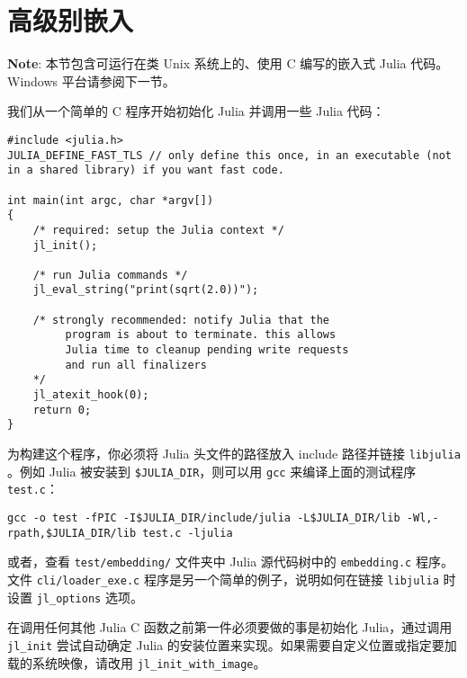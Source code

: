 \hypertarget{10185907435024062430}{}


\section{高级别嵌入}



\textbf{Note}: 本节包含可运行在类 Unix 系统上的、使用 C 编写的嵌入式 Julia 代码。Windows 平台请参阅下一节。



我们从一个简单的 C 程序开始初始化 Julia 并调用一些 Julia 代码：




\begin{lstlisting}
#include <julia.h>
JULIA_DEFINE_FAST_TLS // only define this once, in an executable (not in a shared library) if you want fast code.

int main(int argc, char *argv[])
{
    /* required: setup the Julia context */
    jl_init();

    /* run Julia commands */
    jl_eval_string("print(sqrt(2.0))");

    /* strongly recommended: notify Julia that the
         program is about to terminate. this allows
         Julia time to cleanup pending write requests
         and run all finalizers
    */
    jl_atexit_hook(0);
    return 0;
}
\end{lstlisting}



为构建这个程序，你必须将 Julia 头文件的路径放入 include 路径并链接 \texttt{libjulia} 。例如 Julia 被安装到 \texttt{\$JULIA\_DIR}，则可以用 \texttt{gcc} 来编译上面的测试程序 \texttt{test.c}：




\begin{lstlisting}
gcc -o test -fPIC -I$JULIA_DIR/include/julia -L$JULIA_DIR/lib -Wl,-rpath,$JULIA_DIR/lib test.c -ljulia
\end{lstlisting}



或者，查看 \texttt{test/embedding/} 文件夹中 Julia 源代码树中的 \texttt{embedding.c} 程序。 文件 \texttt{cli/loader\_exe.c} 程序是另一个简单的例子，说明如何在链接 \texttt{libjulia} 时设置 \texttt{jl\_options} 选项。



在调用任何其他 Julia C 函数之前第一件必须要做的事是初始化 Julia，通过调用 \texttt{jl\_init} 尝试自动确定 Julia 的安装位置来实现。如果需要自定义位置或指定要加载的系统映像，请改用 \texttt{jl\_init\_with\_image}。



